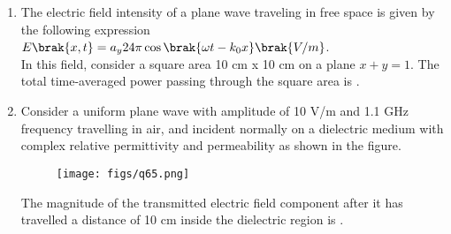 \documentclass[a4paper, 11pt]{article}
\begin{document}
\begin{enumerate}
    \hfill{}

    \item The electric field intensity of a plane wave traveling in free space is given by the following expression\\$E\brak{x,t}=a_{y}24\pi \cos\brak{\omega t-k_{0}x}\brak{V/m}$.\\In this field, consider a square area 10 cm x 10 cm on a plane $x+y=1$. The total time-averaged power  passing through the square area is \underline{\hspace{2cm}}.
    
    \hfill{}

    \item Consider a uniform plane wave with amplitude  of 10 V/m and 1.1 GHz frequency travelling in air, and incident normally on a dielectric medium with complex relative permittivity  and permeability  as shown in the figure.
    \begin{figure}[H]
        \centering
        \texttt{[image: figs/q65.png]}
        \caption*{}
        \label{fig:q65}
    \end{figure}
    The magnitude of the transmitted electric field component  after it has travelled a distance of 10 cm inside the dielectric region is \underline{\hspace{2cm}}.
    
    \hfill{}

\end{enumerate}
\end{document}
